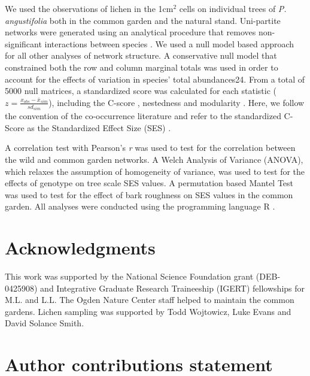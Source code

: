 \documentclass[fleqn,10pt]{wlscirep}
\begin{document}
We used the observations of lichen in the 1cm$^2$ cells on individual
trees of \textit{P. angustifolia} both in the common garden and the
natural stand. Uni-partite networks were generated using an analytical
procedure that removes non-significant interactions between species
\cite{Araujo2011}. We used a null model based approach for all other
analyses of network structure. A conservative null model that
constrained both the row and column marginal totals was used in order
to account for the effects of variation in species’ total
abundances24. From a total of 5000 null matrices, a standardized score
was calculated for each statistic ($z = \frac{x_{obs} -
  \bar{x}_{sim}}{sd_{sim}}$), including the C-score \cite{Stone1990a},
nestedness \cite{Atmar1993} and modularity \cite{Newman2006}. Here, we
follow the convention of the co-occurrence literature and refer to the
standardized C-Score as the Standardized Effect Size (SES)
\cite{Gotelli2001}.

A correlation test with Pearson’s \textit{r} was used to test for the
correlation between the wild and common garden networks. A Welch
Analysis of Variance (ANOVA), which relaxes the assumption of
homogeneity of variance, was used to test for the effects of genotype
on tree scale SES values. A permutation based Mantel Test was used to
test for the effect of bark roughness on SES values in the common
garden. All analyses were conducted using the programming language R
\cite{RCoreTeam2017}.





\section*{Acknowledgments} 

This work was supported by the National Science Foundation grant
(DEB-0425908) and Integrative Graduate Research Traineeship (IGERT)
fellowships for M.L. and L.L. The Ogden Nature Center staff helped to
maintain the common gardens. Lichen sampling was supported by Todd
Wojtowicz, Luke Evans and David Solance Smith.


\section*{Author contributions statement}
\end{document}
